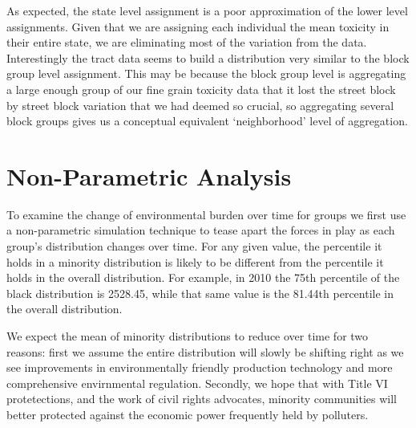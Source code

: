 \documentclass[12pt,twoside]{dukestatscithesis}
\theoremstyle{definition}
\theoremstyle{definition}
\theoremstyle{definition}
\theoremstyle{remark}
\begin{document}
As expected, the state level assignment is a poor approximation of the
lower level assignments. Given that we are assigning each individual the
mean toxicity in their entire state, we are eliminating most of the
variation from the data. Interestingly the tract data seems to build a
distribution very similar to the block group level assignment. This may
be because the block group level is aggregating a large enough group of
our fine grain toxicity data that it lost the street block by street
block variation that we had deemed so crucial, so aggregating several
block groups gives us a conceptual equivalent `neighborhood' level of
aggregation.

\section{Non-Parametric Analysis}\label{non-parametric-analysis}

To examine the change of environmental burden over time for groups we
first use a non-parametric simulation technique to tease apart the
forces in play as each group's distribution changes over time. For any
given value, the percentile it holds in a minority distribution is
likely to be different from the percentile it holds in the overall
distribution. For example, in 2010 the 75th percentile of the black
distribution is 2528.45, while that same value is the 81.44th percentile
in the overall distribution.

We expect the mean of minority distributions to reduce over time for two
reasons: first we assume the entire distribution will slowly be shifting
right as we see improvements in environmentally friendly production
technology and more comprehensive envirnmental regulation. Secondly, we
hope that with Title VI protetections, and the work of civil rights
advocates, minority communities will better protected against the
economic power frequently held by polluters.
\end{document}
